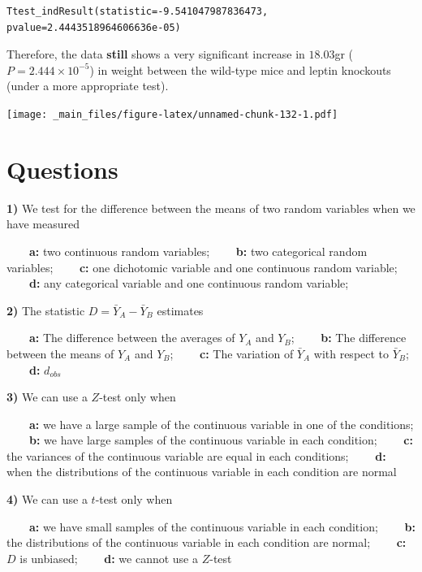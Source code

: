 \documentclass[
]{book}
\begin{document}
\begin{verbatim}
Ttest_indResult(statistic=-9.541047987836473, pvalue=2.4443518964606636e-05)
\end{verbatim}

Therefore, the data \textbf{still} shows a very significant increase in \(18.03\)gr (\(P=2.444 \times 10^{-5}\)) in weight between the wild-type mice and leptin knockouts (under a more appropriate test).

\texttt{[image: \_main\_files/figure-latex/unnamed-chunk-132-1.pdf]}

\hypertarget{questions-12}{%
\section{Questions}\label{questions-12}}

\textbf{1)} We test for the difference between the means of two random variables when we have measured

\textbf{\(\qquad\)a:} two continuous random variables;
\textbf{\(\qquad\)b:} two categorical random variables;
\textbf{\(\qquad\)c:} one dichotomic variable and one continuous random variable;
\textbf{\(\qquad\)d:} any categorical variable and one continuous random variable;

\textbf{2)} The statistic \(D=\bar{Y}_A-\bar{Y}_B\) estimates

\textbf{\(\qquad\)a:} The difference between the averages of \(Y_A\) and \(Y_B\);
\textbf{\(\qquad\)b:} The difference between the means of \(Y_A\) and \(Y_B\);
\textbf{\(\qquad\)c:} The variation of \(\bar{Y}_A\) with respect to \(\bar{Y}_B\);
\textbf{\(\qquad\)d:} \(d_{obs}\)

\textbf{3)} We can use a \(Z\)-test only when

\textbf{\(\qquad\)a:} we have a large sample of the continuous variable in one of the conditions;
\textbf{\(\qquad\)b:} we have large samples of the continuous variable in each condition;
\textbf{\(\qquad\)c:} the variances of the continuous variable are equal in each conditions;
\textbf{\(\qquad\)d:} when the distributions of the continuous variable in each condition are normal

\textbf{4)} We can use a \(t\)-test only when

\textbf{\(\qquad\)a:} we have small samples of the continuous variable in
each condition;
\textbf{\(\qquad\)b:} the distributions of the continuous variable in each condition are normal;
\textbf{\(\qquad\)c:} \(D\) is unbiased;
\textbf{\(\qquad\)d:} we cannot use a \(Z\)-test
\end{document}
